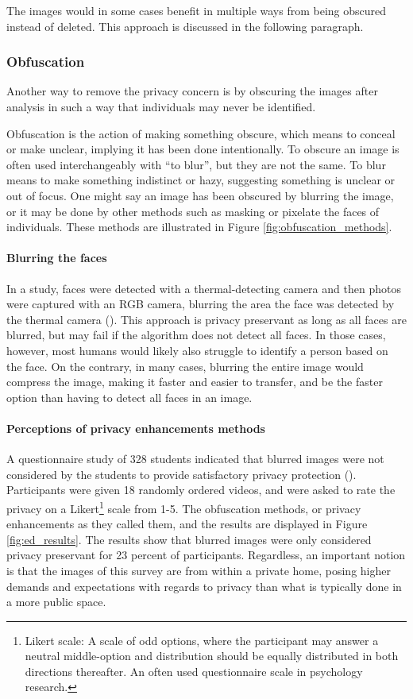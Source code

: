 The images would in some cases benefit in multiple ways from being obscured instead of deleted. This approach is discussed in the following paragraph.

\subsubsection{Obfuscation}
\label{sec:obfuscation}
Another way to remove the privacy concern is by obscuring the images after analysis in such a way that individuals may never be identified.

Obfuscation is the action of making something obscure, which means to conceal or make unclear, implying it has been done intentionally. To obscure an image is often used interchangeably with “to blur”, but they are not the same. To blur means to make something indistinct or hazy, suggesting something is unclear or out of focus. One might say an image has been obscured by blurring the image, or it may be done by other methods such as masking or pixelate the faces of individuals. These methods are illustrated in Figure \ref{fig:obfuscation_methods}.

\paragraph{Blurring the faces}
In a \citeyear{ma2019fall_anonymous} study, faces were detected with a thermal-detecting camera and then photos were captured with an RGB camera, blurring the area the face was detected by the thermal camera (\citeauthor{ma2019fall_anonymous}). This approach is privacy preservant as long as all faces are blurred, but may fail if the algorithm does not detect all faces. In those cases, however, most humans would likely also struggle to identify a person based on the face. On the contrary, in many cases, blurring the entire image would compress the image, making it faster and easier to transfer, and be the faster option than having to detect all faces in an image.

\paragraph{Perceptions of privacy enhancements methods}
A questionnaire study of 328 students indicated that blurred images were not considered by the students to provide satisfactory privacy protection (\cite{ed2012privacy_review}). Participants were given 18 randomly ordered videos, and were asked to rate the privacy on a Likert\footnote{Likert scale: A scale of odd options, where the participant may answer a neutral middle-option and distribution should be equally distributed in both directions thereafter. An often used questionnaire scale in psychology research.} scale from 1-5. The obfuscation methods, or privacy enhancements as they called them, and the results are displayed in Figure \ref{fig:ed_results}. The results show that blurred images were only considered privacy preservant for 23 percent of participants. Regardless, an important notion is that the images of this survey are from within a private home, posing higher demands and expectations with regards to privacy than what is typically done in a more public space.

